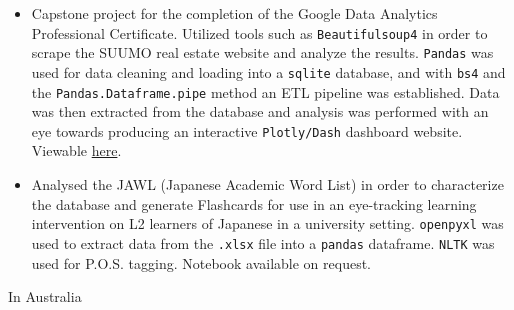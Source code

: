 \documentclass[10pt,a4paper,ragged2e,withhyper]{altacv}
\begin{document}
\begin{paracol}{2}
\label{sec:orgc8a7827}
\begin{itemize}
\item Capstone project for the completion of the Google Data Analytics Professional Certificate. Utilized tools such as \texttt{Beautifulsoup4} in order to scrape the SUUMO real estate website and analyze the results. \texttt{Pandas} was used for data cleaning and loading into a \texttt{sqlite} database, and with \texttt{bs4} and the \texttt{Pandas.Dataframe.pipe} method an ETL pipeline was established. Data was then extracted from the database and analysis was performed with an eye towards producing an interactive \texttt{Plotly/Dash} dashboard website. Viewable \href{https://github.com/nanjigen/tokyo-rentals-analysis}{here}.
\end{itemize}
\begin{itemize}
\item Analysed the JAWL (Japanese Academic Word List) in order to characterize the database and generate Flashcards for use in an eye-tracking learning intervention on L2 learners of Japanese in a university setting. \texttt{openpyxl} was used to extract data from the \texttt{.xlsx} file into a \texttt{pandas} dataframe. \texttt{NLTK} was used for P.O.S. tagging. Notebook available on request.
\end{itemize}

\label{sec:org1cdc4ae}
In Australia
\switchcolumn

\label{sec:org96ba980}





\end{paracol}
\end{document}
